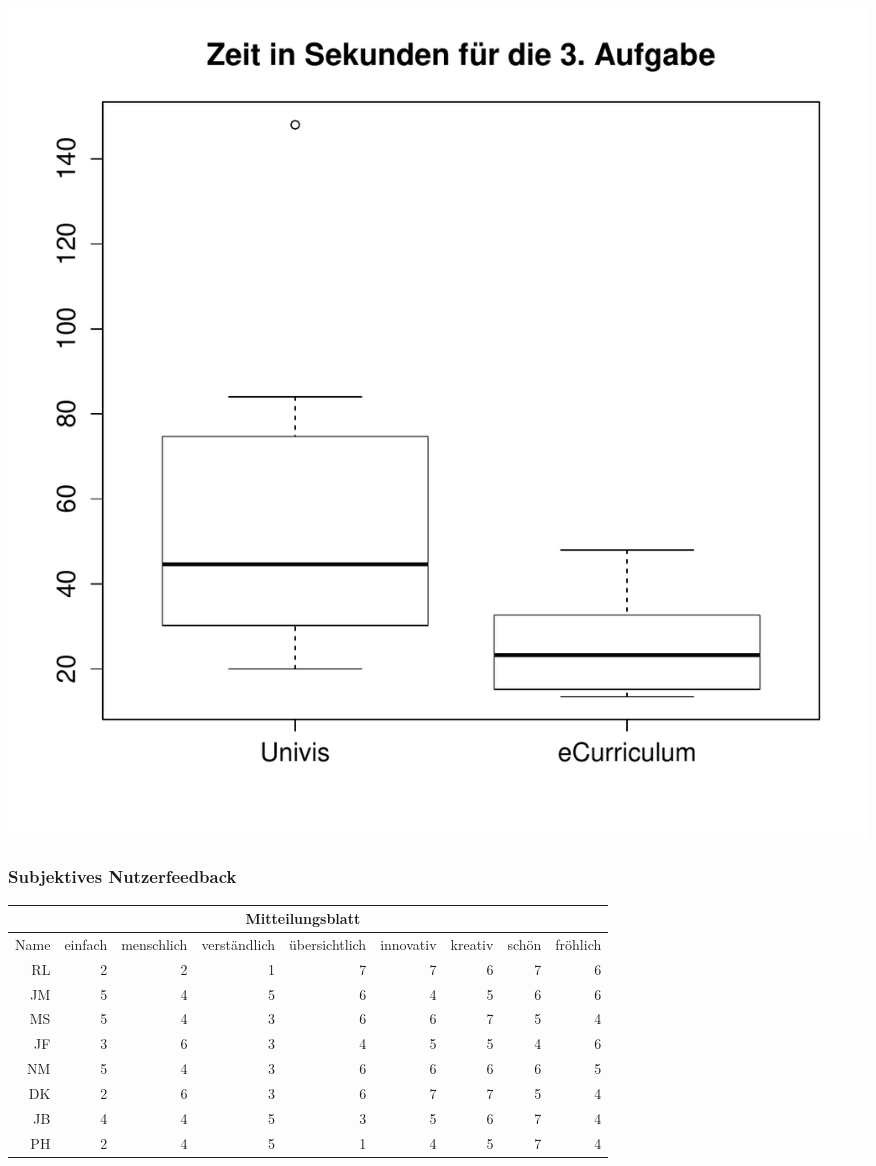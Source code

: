\documentclass[a4paper,10pt]{scrartcl}
\begin{document}
\begin{center}
 \includegraphics[width=\linewidth]{./Appendix/Plots/Boxplots/a3_boxplot.pdf}
\end{center}

\subsubsection*{Subjektives Nutzerfeedback} 

\begin{center}
\begin{tabular}{r|r|r|r|r|r|r|r|r}
     & \multicolumn{7}{c}{Mitteilungsblatt} \\ \hline
    Name & einfach & menschlich & verständlich & übersichtlich & innovativ & kreativ & schön & fröhlich \\ \hline
    RL & 2 & 2 & 1 & 7 & 7 & 6 & 7 & 6 \\ \hline
    JM & 5 & 4 & 5 & 6 & 4 & 5 & 6 & 6 \\ \hline
    MS & 5 & 4 & 3 & 6 & 6 & 7 & 5 & 4 \\ \hline
    JF & 3 & 6 & 3 & 4 & 5 & 5 & 4 & 6 \\ \hline
    NM & 5 & 4 & 3 & 6 & 6 & 6 & 6 & 5 \\ \hline
    DK & 2 & 6 & 3 & 6 & 7 & 7 & 5 & 4 \\ \hline
    JB & 4 & 4 & 5 & 3 & 5 & 6 & 7 & 4 \\ \hline
    PH & 2 & 4 & 5 & 1 & 4 & 5 & 7 & 4 \\
\end{tabular}
\end{center}
\end{document}
